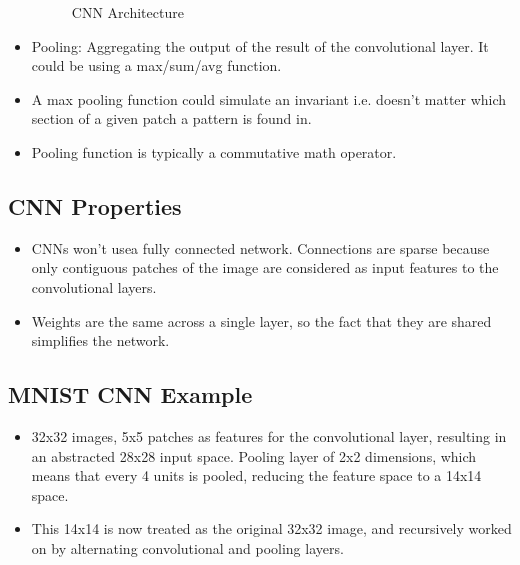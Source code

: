 \documentclass[parskip=half]{scrartcl}
\begin{document}
\begin{itemize}
\begin{figure}[ht]
            \caption{CNN Architecture}
            \label{fig:cnn-arch}
        \end{figure}
        \item 
        Pooling: Aggregating the output of the result of the convolutional layer. It could be using a max/sum/avg function.
        \item 
        A max pooling function could simulate an invariant i.e. doesn't matter which section of a given patch a pattern is found in.
        \item 
        Pooling function is typically a commutative math operator.
    \end{itemize}


    \subsection{CNN Properties} %
    \label{sub:cnn_properties}
    
        \begin{itemize}
            \item 
            CNNs won't usea fully connected network. Connections are sparse because only contiguous patches of the image are considered as input features to the convolutional layers.
            \item 
            Weights are the same across a single layer, so the fact that they are shared simplifies the network.
        \end{itemize}


    \subsection{MNIST CNN Example} %
    \label{sub:mnist_cnn_example}

        \begin{itemize}
            \item 
            32x32 images, 5x5 patches as features for the convolutional layer, resulting in an abstracted 28x28 input space. Pooling layer of 2x2 dimensions, which means that every 4 units is pooled, reducing the feature space to a 14x14 space.
            \item 
            This 14x14 is now treated as the original 32x32 image, and recursively worked on by alternating convolutional and pooling layers.
        \end{itemize}
    
\end{document}
